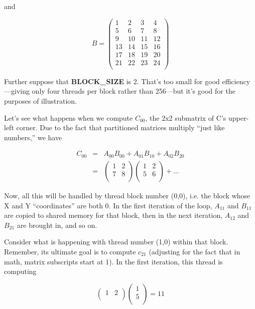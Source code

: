 and

\begin{equation}
B =
\left (
\begin{array}{cccc}
1 & 2 & 3 & 4  \\
5 & 6 & 7 & 8  \\
9 & 10 & 11 & 12  \\
13 & 14 & 15 & 16  \\
17 & 18 & 19 & 20  \\
21 & 22 & 23 & 24  \\
\end{array}
\right ) 
\end{equation}

Further suppose that {\bf BLOCK\_SIZE} is 2.  That's too small for good
efficiency---giving only four threads per block rather than 256---but
it's good for the purposes of illustration.  

Let's see what happens when we compute $C_{00}$, the 2x2 submatrix of
C's upper-left corner.  Due to the fact that partitioned matrices
multiply ``just like numbers,'' we have

\begin{eqnarray}
C_{00} &=& A_{00} B_{00} + A_{01} B_{10} + A_{02} B_{20} \\
&=& 
\left (
\begin{array}{cc}
1 & 2 \\
7 & 8 \\
\end{array}
\right )
\left (
\begin{array}{cc}
1 & 2 \\
5 & 6 \\
\end{array}
\right ) + ...
\end{eqnarray}

Now, all this will be handled by thread block number (0,0), i.e. the
block whose X and Y ``coordinates'' are both 0.  In the first iteration
of the loop, $A_{11}$ and $B_{11}$ are copied to shared memory for that
block, then in the next iteration, $A_{12}$ and $B_{21}$ are brought in,
and so on.

Consider what is happening with thread number (1,0) within that block.
Remember, its ultimate goal is to compute $c_{21}$ (adjusting for the
fact that in math, matrix subscripts start at 1).  In the first
iteration, this thread is computing

\begin{equation}
\left (
\begin{array}{cc}
1 & 2\\
\end{array}
\right )
\left (
\begin{array}{c}
1 \\
5 \\
\end{array}
\right )
= 11
\end{equation}


